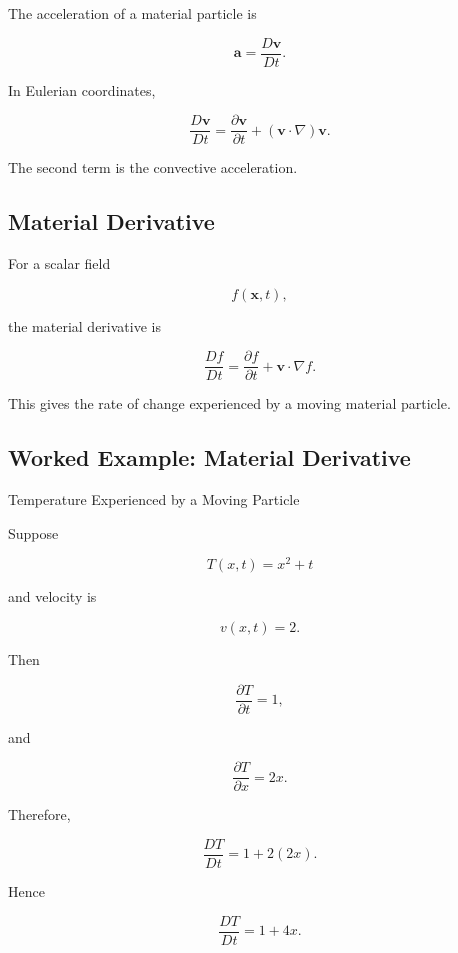 The acceleration of a material particle is

\[
\boxed{
\mathbf{a}
=
\frac{D\mathbf{v}}{Dt}.
}
\]

In Eulerian coordinates,

\[
\boxed{
\frac{D\mathbf{v}}{Dt}
=
\frac{\partial\mathbf{v}}{\partial t}
+
(\mathbf{v}\cdot\nabla)\mathbf{v}.
}
\]

The second term is the convective acceleration.

\subsection{Material Derivative}
\label{subsec:material-derivative}

For a scalar field

\[
f(\mathbf{x},t),
\]

the material derivative is

\[
\boxed{
\frac{Df}{Dt}
=
\frac{\partial f}{\partial t}
+
\mathbf{v}\cdot\nabla f.
}
\]

This gives the rate of change experienced by a moving material particle.

\subsection{Worked Example: Material Derivative}
\label{subsec:worked-material-derivative}

\begin{workedexamplebox}{Temperature Experienced by a Moving Particle}

Suppose

\[
T(x,t)=x^2+t
\]

and velocity is

\[
v(x,t)=2.
\]

Then

\[
\frac{\partial T}{\partial t}
=
1,
\]

and

\[
\frac{\partial T}{\partial x}
=
2x.
\]

Therefore,

\[
\frac{DT}{Dt}
=
1
+
2(2x).
\]

Hence

\begin{answerbox}
\[
\boxed{
\frac{DT}{Dt}
=
1+4x.
}
\]
\end{answerbox}

\end{workedexamplebox}

